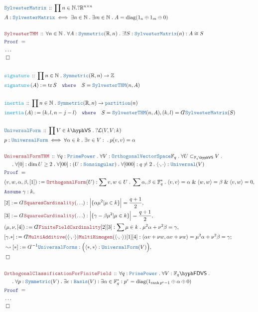 \documentclass[12pt]{scrartcl}%
\newcommand{\TYPE}[1]{\textcolor{NavyBlue}{\mathtt{#1}}}%
\newcommand{\FUNC}[1]{\textcolor{Cerulean}{\mathtt{#1}}}%
\newcommand{\LOGIC}[1]{\textcolor{Blue}{\mathtt{#1}}}%
\newcommand{\THM}[1]{\textcolor{Maroon}{\mathtt{#1}}}%
\renewcommand{\.}{\; . \;} %
\newcommand{\de}{: \kern 0.1pc =} %
\newcommand{\where}{\LOGIC{where}} %
\newcommand{\Act}[1]{\left( #1 \right)} %
\newcommand{\Theorem}[2]{& \THM{#1} \, :: \, #2 \\ & \Proof = \\ } %
\newcommand{\DeclareType}[2]{& \TYPE{#1} \, :: \, #2 \\}%
\newcommand{\DefineType}[3]{& #1 : \TYPE{#2} \iff #3 \\}%
\newcommand{\DeclareFunc}[2]{& \FUNC{#1} \, :: \, #2 \\}%
\newcommand{\DefineFunc}[3]{&  \FUNC{#1}\Act{#2} \de #3 \\}%
\newcommand{\NewLine}{\\ & \kern 1pc}%
\newcommand{\Page}[1]{ \begin{align*} #1 \end{align*}  }%
\newcommand{ \bd }{ \ByDef }%
\newcommand{\NoProof}{ & \ldots \\ \EndProof}%
\renewcommand{\And}{\; \& \;}%
\newcommand{\Int}{\mathbb{Z}}%
\newcommand{\Reals}{\mathbb{R}}%
\newcommand{\Nat}{\mathbb{N}}%
\newcommand{\Say}[3]{& #1 \de #2 : #3, \\} %
\newcommand{\Conclude}[3]{& #1 \de #2 : #3; \\}%
\newcommand{\Derive}[3]{& \leadsto #1 \de #2 : #3, \\} %
\newcommand{\Assume}[2]{& \LOGIC{Assume} \; #1 : #2, \\} %
\newcommand{\QED}{\; \square} %
\newcommand{\EndProof}{& \QED \\} %
\newcommand{\ByDef}{\rotatebox[origin=c]{-180}{$D$}}%
\newcommand{\Proof}{\LOGIC{Proof} \; } %
\DeclareMathOperator{\rank}{rank} %
\newcommand{\subvec}[1]{\subset_{\VS{#1}}}%
\newcommand{\OVS}{\TYPE{OrthogonalVectorSpace}}
\DeclareMathOperator{\diag}{diag} %
\DeclareMathOperator{\tr}{tr}     %
\newcommand{\VS}[1]{#1\hyph\mathsf{VS}} %
\newcommand{\FDVS}[1]{#1\hyph\mathsf{FDVS}} %
\renewcommand{\L}{\mathcal{L}}
\begin{document}
\Page{
	\DeclareType{SylvesterMatrix}{\prod n \in \Nat. ?\Reals^{n \times n} }
	\DefineType{A}{SylvesterMatrix}{\exists n \in \Nat \. \exists m \in \Nat \. A = \diag(1_n \oplus 1_m \oplus 0)}
	\\
	\Theorem{SylvesterTHM}{  
		\forall n \in \Nat \. \forall A : \TYPE{Symmetric}(\Reals, n) \. \exists! S : \TYPE{SylvesterMatrix}(n) :  A \cong S
	}
	\NoProof
	\\
	\DeclareFunc{signature}{\prod n \in \Nat \. \TYPE{Symmetric}(\Reals,n) \to \Int}
	\DefineFunc{signature}{A}{\tr S \quad \where \quad S = \TYPE{SylvesterTHM}(n,A)}
	\\
	\DeclareFunc{inertia}{\prod n \in \Nat \. \TYPE{Symmetric}(\Reals,n) \to \TYPE{partition}(n)}
	\DefineFunc{inertia}{A}{ (k,l,n-j-l) \quad \where \quad S = \TYPE{SylvesterTHM}(n,A), (k,l) = \bd \TYPE{SylvesterMatrix}(S)}
	\\
	\DeclareType{UniversalForm}{\prod V \in \VS{k} \. ?\L(V,V;k)}
	\DefineType{p}{UniversalForm}{\forall \alpha \in k \. \exists v \in V : \. p(v,v) = \alpha}
	\\
	\Theorem{UniversalFormTHM}{
		\forall q : \TYPE{PrimePower} \. 
		\forall V : \OVS{\mathbb{F}_q} \. 
		\forall U \subvec{\mathbb{F}_q} V \.\NewLine \.  
		\forall [0] : \dim U \ge 2 \.
		\forall [00] : ( U : \TYPE{Nonsingular} ) \.
		\forall [000] : q \neq 2 \.
		\langle \cdot, \cdot \rangle : \TYPE{Universal}(V)} 
	\Say{(v,w,\alpha,\beta,[1])}{\THM{OrthogonalForm}(U)}{ \sum v,w \in U \. \sum \alpha,\beta \in \mathbb{F}_q^* \. \langle v,v\rangle = \alpha \And \langle w, w \rangle = \beta \And \langle v, w \rangle = 0  }
	\Assume{\gamma}{k}
	\Say{[2]}{\bd \THM{SquaresCardinality}(\ldots)}{ \Big| \{ \alpha \mu^2 | \mu \in k \} \Big| = \frac{q+1}{2}}
	\Say{[3]}{\bd \THM{SquaresCardinality}(\ldots)}{ \Big| \{ \gamma - \beta \mu^2 | \mu \in k \}\Big| = \frac{q+1}{2} }
	\Say{(\mu,\nu,[4])}{\bd \THM{FiniteFieldCardinality}[2][3]}{\sum \mu \in k \. \mu^2 \alpha + \nu^2 \beta = \gamma }
	\Conclude{[\gamma.*]}{\bd \THM{MultiAdditive}(\langle \cdot,\cdot \rangle )\THM{MultiHimogen}(\langle \cdot,\cdot \rangle)[1][4]}{  \langle \alpha v + \nu w, \alpha v + \nu w \rangle = \mu^2 \alpha + \nu^2 \beta = \gamma    }
	\Derive{[*]}{\bd^{-1}\TYPE{UniversalForms}}{\Big( \langle *,* \rangle : \TYPE{UniversalForm}(V) \Big)}
	\EndProof
	\\
	\Theorem{OrthogonalClassificationForFiniteField}{
		\forall q : \TYPE{PrimePower} \. 
		\forall V : \FDVS{\mathbb{F}_q} \. \NewLine \.  
		\forall p : \TYPE{Symmetric}(V) \. 
		\exists e : \TYPE{Basis}(V) :  
		\exists \alpha \in \mathbb{F}_q^* :
		p^e = \diag(1_{\rank p^e-1} \oplus \alpha \oplus 0) 
	}
	\NoProof
}
\newpage
\end{document}
